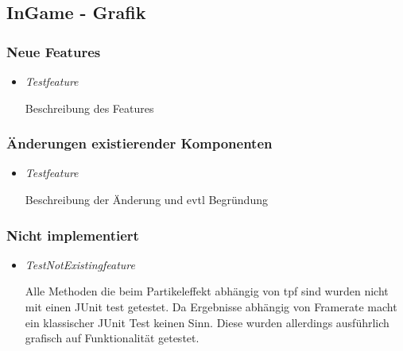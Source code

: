 \subsection{InGame - Grafik}

\subsubsection{Neue Features}
\begin{itemize}
    \item \textit{Testfeature}
        \begin{leftbar}[0.9\linewidth]
            Beschreibung des Features
        \end{leftbar}
\end{itemize}

\subsubsection{Änderungen existierender Komponenten}
\begin{itemize}
    \item \textit{Testfeature}
        \begin{leftbar}[0.9\linewidth]
            Beschreibung der Änderung und evtl Begründung
        \end{leftbar}
\end{itemize}

\subsubsection{Nicht implementiert}
\begin{itemize}
    \item \textit{TestNotExistingfeature}
        \begin{leftbar}[0.9\linewidth]
            Alle Methoden die beim Partikeleffekt abhängig von tpf sind wurden nicht
            mit einen JUnit test getestet. Da Ergebnisse abhängig von Framerate macht
            ein klassischer JUnit Test keinen Sinn. Diese wurden allerdings ausführlich
            grafisch auf Funktionalität getestet. 
        \end{leftbar}
\end{itemize}